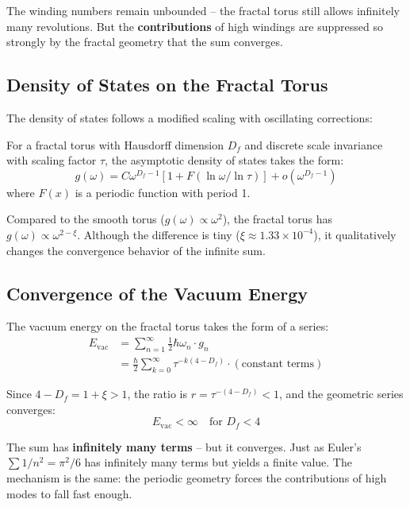 	The winding numbers remain unbounded -- the fractal torus still allows infinitely many revolutions. But the \textbf{contributions} of high windings are suppressed so strongly by the fractal geometry that the sum converges.
	
	\subsection{Density of States on the Fractal Torus}
	
	The density of states follows a modified scaling with oscillating corrections:
	
	\begin{keypoint}
		For a fractal torus with Hausdorff dimension $D_f$ and discrete scale invariance with scaling factor $\tau$, the asymptotic density of states takes the form:
		\begin{equation}
			g(\omega) = C \omega^{D_f-1} \left[ 1 + F(\ln \omega / \ln \tau) \right] + o(\omega^{D_f-1})
			\label{eq:dos-fractal}
		\end{equation}
		where $F(x)$ is a periodic function with period 1.
	\end{keypoint}
	
	Compared to the smooth torus ($g(\omega) \propto \omega^2$), the fractal torus has $g(\omega) \propto \omega^{2-\xi}$. Although the difference is tiny ($\xi \approx 1.33 \times 10^{-4}$), it qualitatively changes the convergence behavior of the infinite sum.
	
	\subsection{Convergence of the Vacuum Energy}
	
	The vacuum energy on the fractal torus takes the form of a series:
	\begin{align}
		E_{\text{vac}} &= \sum_{n=1}^{\infty} \frac{1}{2} \hbar \omega_n \cdot g_n \\
		&= \frac{\hbar}{2} \sum_{k=0}^{\infty} \tau^{-k(4-D_f)} \cdot (\text{constant terms})
	\end{align}
	
	Since $4 - D_f = 1 + \xi > 1$, the ratio is $r = \tau^{-(4-D_f)} < 1$, and the geometric series converges:
	\begin{equation}
		E_{\text{vac}} < \infty \quad \text{for } D_f < 4
	\end{equation}
	
	The sum has \textbf{infinitely many terms} -- but it converges. Just as Euler's $\sum 1/n^2 = \pi^2/6$ has infinitely many terms but yields a finite value. The mechanism is the same: the periodic geometry forces the contributions of high modes to fall fast enough.
	
